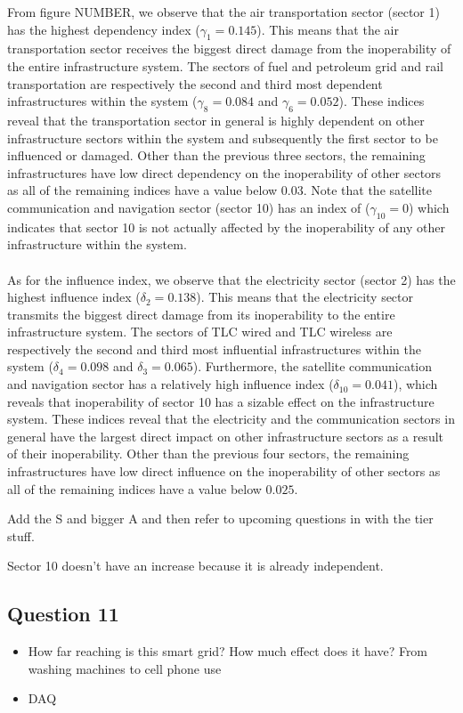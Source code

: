 \documentclass[11pt,a4paper]{article}
\begin{document}
From figure NUMBER, we observe that the air transportation sector (sector 1) has the highest dependency index ($\gamma_1 = 0.145$). This means that the air transportation sector
receives the biggest direct damage from the inoperability of the entire infrastructure system. The sectors of fuel and petroleum grid and rail transportation are respectively the second and third most dependent infrastructures within the system ($\gamma_8 = 0.084$  and  $\gamma_6 = 0.052$). These indices reveal that the transportation sector in general is highly dependent on other infrastructure sectors within the system and subsequently the first sector to be influenced or damaged. Other than the previous three sectors, the remaining infrastructures have low direct dependency on the inoperability of other sectors as all of the remaining indices have a value below $0.03$. Note that the satellite communication and navigation sector (sector 10) has an index of ($\gamma_10 = 0$) which indicates that sector 10 is not actually affected by the inoperability of any other infrastructure within the system.\\
\\
As for the influence index, we observe that the electricity sector (sector 2) has the highest influence index ($\delta_2 = 0.138$). This means that the electricity sector
transmits the biggest direct damage from its inoperability to the entire infrastructure system. The sectors of TLC wired and TLC wireless are respectively the second and third most influential infrastructures within the system ($\delta_4 = 0.098$  and  $\delta_3 = 0.065$). Furthermore, the satellite communication and navigation sector has a relatively high influence index ($\delta_10 = 0.041$), which reveals that inoperability of sector 10 has a sizable effect on the infrastructure system. These indices reveal that the electricity and the communication sectors in general have the largest direct impact on other infrastructure sectors as a result of their inoperability. Other than the previous four sectors, the remaining infrastructures have low direct influence on the inoperability of other sectors as all of the remaining indices have a value below $0.025$.

Add the S and bigger A
and then refer to upcoming questions in with the tier stuff.

Sector 10 doesn't have an increase because it is already independent.

\subsection*{Question 11}
\begin{itemize}
	\item How far reaching is this smart grid? How much effect does it have? From washing machines to cell phone use
	\item DAQ
\end{itemize}
\end{document}

